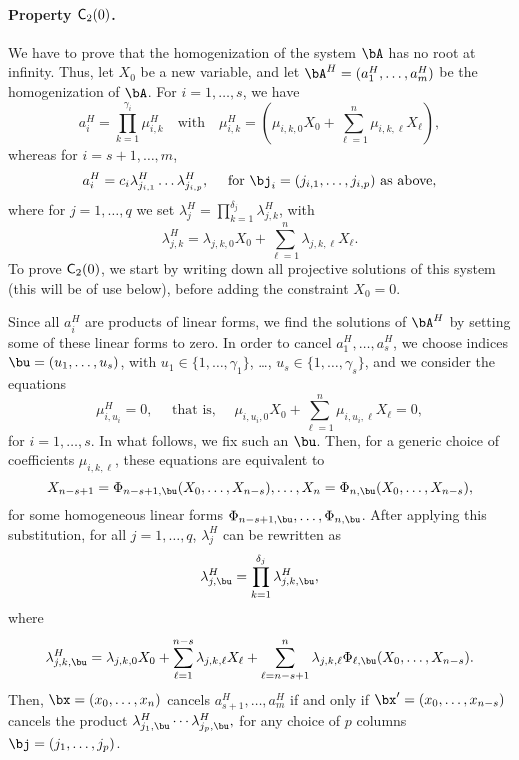 \documentclass[12pt]{article}
\begin{document}
\paragraph{Property $\mathsf{C}_2(0)$.} We have to prove that the homogenization
of the system $\bA$ has no root at infinity. Thus, let $X_0$ be a new
variable, and let $\bA^H=(a_1^H,\dots,a_m^H)$ be the homogenization
of $\bA$. For $i=1,\dots,s$, we have
$$a_i^H=\prod_{k=1}^{\gamma_i} \mu^H_{i,k} \quad\text{with}\quad \mu^H_{i,k}=(\mu_{i,k,0}X_0 + \sum_{\ell = 1}^{n}\mu_{i,k,\ell}X_\ell),$$
whereas for $i=s+1,\dots,m$, 
$$a_i^H=c_i \lambda^H_{j_{i,1}}\ldots \lambda^H_{j_{i,p}}, \quad \text{~for~} \bj_i=(j_{i,1},\dots,j_{i,p}) \text{~as above},$$
where for $j=1,\dots,q$ we set 
$\lambda^H_j = \prod_{k=1}^{\delta_j}\lambda^H_{j,k}$,
with
$$\lambda^H_{j,k}=\lambda_{j,k,0}X_0 + \sum_{\ell = 1}^{n}\lambda_{j,k,\ell}X_\ell.$$
To prove  $\mathsf{C}_2(0)$, we start by writing down all projective
solutions of this system (this will be of use below), before adding
the constraint $X_0=0$.

Since all $a_i^H$ are products of linear forms, we find the solutions
of $\bA^H$ by setting some of these linear forms to zero. In order to
cancel $a_1^H,\dots,a_s^H$, we choose indices $\bu=(u_1,\dots,u_s)$,
with $u_1\in\{1,\dots,\gamma_1\}$, \dots,
$u_s\in\{1,\dots,\gamma_s\}$, and we consider the equations 
$$\mu^H_{i,u_i}=0, \quad \text{~that is,~} \quad \mu_{i,u_i,0}X_0 + \sum_{\ell = 1}^{n}\mu_{i,u_i,\ell}X_\ell =0,$$ for $i=1,\dots,s$.
In what follows, we fix such an $\bu$.
Then, for a generic choice of coefficients $\mu_{i,k,\ell}$, these equations
are equivalent to
$$X_{n-s+1}=\Phi_{n-s+1,\bu}(X_0,\dots,X_{n-s}),\dots,X_{n}=\Phi_{n,\bu}(X_0,\dots,X_{n-s}),$$
for some homogeneous linear forms
$\Phi_{n-s+1,\bu},\dots,\Phi_{n,\bu}$.  After applying this
substitution, for all $j=1,\dots,q$, $\lambda^H_j$ can be rewritten as
$$\lambda^H_{j,\bu}=\prod_{k=1}^{\delta_j}\lambda^H_{j,k,\bu},$$
where 
$$\lambda^H_{j,k,\bu}=\lambda_{j,k,0}X_0 + \sum_{\ell =
  1}^{n-s}\lambda_{j,k,\ell}X_\ell + \sum_{\ell =
  n-s+1}^{n}\lambda_{j,k,\ell}
\Phi_{\ell,\bu}(X_0,\dots,X_{n-s}).$$ Then,
$\bx=(x_0,\dots,x_n)$ cancels $a^H_{s+1},\dots,a^H_m$ if and only if
$\bx'=(x_0,\dots,x_{n-s})$ cancels the product
$\lambda^H_{j_1,\bu}\cdots \lambda^H_{j_p,\bu},$ for any choice of $p$ columns
$\bj=(j_1,\dots,j_p)$.
\end{document}
